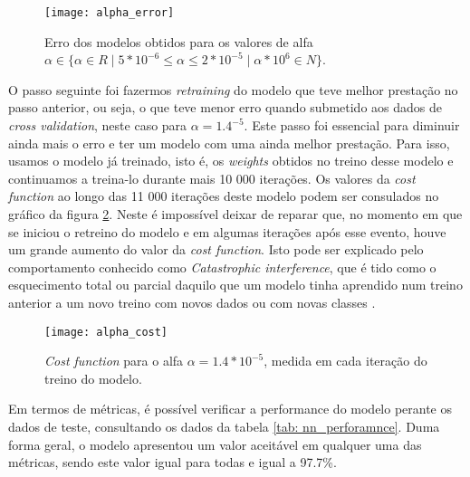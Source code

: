 \begin{figure}[!b]
\centering
\texttt{[image: alpha\_error]}
\caption{Erro dos modelos obtidos para os valores de alfa $\alpha \in \{ \alpha \in \!R \mid 5*10^{-6}  \leq \alpha \leq 2*10^{-5} \mid \alpha * 10^{6} \in \!N \}$.}
\label{fig:nn_error_alfa}
\end{figure}
O passo seguinte foi fazermos \textit{retraining} do modelo que teve melhor prestação no passo anterior, ou seja, o que teve menor erro quando submetido aos dados de \textit{cross validation}, neste caso para $\alpha = 1.4^{-5}$. Este passo foi essencial para diminuir ainda mais o erro e ter um modelo com uma ainda melhor prestação. Para isso, usamos o modelo já treinado, isto é, os \textit{weights} obtidos no treino desse modelo e continuamos a treina-lo durante mais 10 000 iterações. Os valores da \textit{cost function} ao longo das 11 000 iterações deste modelo podem ser consulados no gráfico da figura \ref{fig:nn_alpha_cost}. Neste é impossível deixar de reparar que, no momento em que se iniciou o retreino do modelo e em algumas iterações após esse evento, houve um grande aumento do valor da \textit{cost function}. Isto pode ser explicado pelo comportamento conhecido como \textit{Catastrophic interference}, que é tido como o esquecimento total ou parcial daquilo que um modelo tinha aprendido num treino anterior a um novo treino com novos dados ou com novas classes \cite{catastrophic_interference}.
\begin{figure}[!t]
\centering
\texttt{[image: alpha\_cost]}
\caption{\textit{Cost function} para o alfa $\alpha = 1.4 * 10^{-5}$, medida em cada iteração do treino do modelo.}
\label{fig:nn_alpha_cost}
\end{figure}
Em termos de métricas, é possível verificar a performance do modelo perante os dados de teste, consultando os dados da tabela \ref{tab: nn_perforamnce}. Duma forma geral, o modelo apresentou um valor aceitável em qualquer uma das métricas, sendo este valor igual para todas e igual a 97.7\%.


